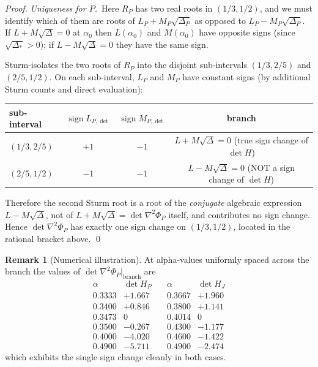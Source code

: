 \documentclass[11pt]{amsart}
\theoremstyle{definition}
\newtheorem{remark}[theorem]{Remark}
\begin{document}
\begin{proof}
\smallskip\noindent\emph{Uniqueness for $P$.}\ Here $R_P$ has two real
roots in $(1/3,1/2)$, and we must identify which of them are roots of
$L_P+M_P\sqrt{\Delta_P}$ as opposed to $L_P-M_P\sqrt{\Delta_P}$.
If $L+M\sqrt{\Delta}=0$ at $\alpha_0$ then $L(\alpha_0)$ and $M(\alpha_0)$
have opposite signs (since $\sqrt{\Delta_*}>0$); if $L-M\sqrt{\Delta}=0$
they have the same sign.

Sturm-isolates the two roots of $R_P$ into the disjoint sub-intervals
$(1/3,2/5)$ and $(2/5,1/2)$.  On each sub-interval, $L_P$ and $M_P$ have
constant signs (by additional Sturm counts and direct evaluation):
\begin{center}
\begin{tabular}{l|cc|c}
sub-interval & $\operatorname{sign} L_{P,\det}$ & $\operatorname{sign} M_{P,\det}$ & branch \\ \hline
$(1/3,2/5)$ & $+1$ & $-1$ & $L+M\sqrt\Delta=0$ (true sign change of $\det H$) \\
$(2/5,1/2)$ & $-1$ & $-1$ & $L-M\sqrt\Delta=0$ (NOT a sign change of $\det H$) \\
\end{tabular}
\end{center}
Therefore the second Sturm root is a root of the
\emph{conjugate} algebraic expression $L-M\sqrt{\Delta}$, not of
$L+M\sqrt{\Delta}=\det\nabla^2\Phi_P$ itself, and contributes no sign change.
Hence $\det\nabla^2\Phi_P$ has exactly one sign change on $(1/3,1/2)$,
located in the rational bracket above.
\qed
\end{proof}

\begin{remark}[Numerical illustration]
At alpha-values uniformly spaced across the branch the values of
$\det\nabla^2\Phi_P\big|_{\text{branch}}$ are
\[
\begin{array}{c|c}
\alpha & \det H_P \\ \hline
0.3333 & +1.667 \\
0.3400 & +0.846 \\
0.3473 & 0      \\
0.3500 & -0.267 \\
0.4000 & -4.020 \\
0.4900 & -5.711
\end{array}
\quad
\begin{array}{c|c}
\alpha & \det H_J \\ \hline
0.3667 & +1.960 \\
0.3800 & +1.141 \\
0.4014 & 0      \\
0.4300 & -1.177 \\
0.4600 & -1.422 \\
0.4900 & -2.474
\end{array}
\]
which exhibits the single sign change cleanly in both cases.
\end{remark}
\end{document}
